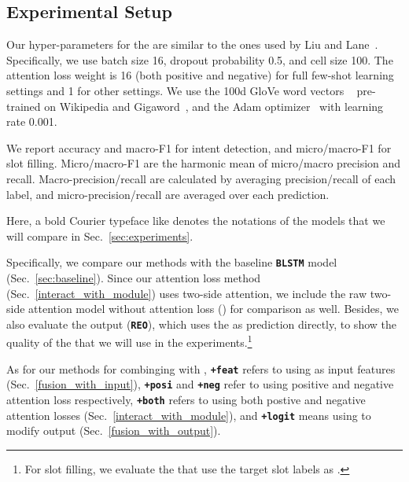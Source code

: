 \subsection{Experimental Setup}
 Our hyper-parameters for the \BLSTM are similar to the ones used by Liu and
Lane~. Specifically, we use batch size 16, dropout probability 0.5, and \BLSTM cell size 100. The attention
loss weight is 16 (both positive and negative) for full few-shot learning settings and 1 for other settings. We use the 100d GloVe word
vectors ~\cite{pennington2014glove} pre-trained on Wikipedia and Gigaword~\cite{parker2011english}, and the Adam
optimizer~\cite{kingma2014adam} with learning rate 0.001.

We report accuracy and macro-F1 for intent detection, and micro/macro-F1 for slot filling.
Micro/macro-F1 are the harmonic mean of micro/macro precision and recall.
Macro-precision/recall are calculated by averaging precision/recall of each label, and micro-precision/recall are averaged over each prediction.

 Here, a bold Courier typeface like \textbf{\BLSTM} denotes the notations of the models that
we will compare in Sec.~\ref{sec:experiments}.

Specifically, we compare our methods with the baseline \textbf{\texttt{BLSTM}} model (Sec.~\ref{sec:baseline}). Since our attention loss
method (Sec.~\ref{interact_with_module}) uses two-side attention, we include the raw two-side attention model without attention loss
(\textbf{\ptatt}) for comparison as well. Besides, we also evaluate the \RE output (\textbf{\texttt{REO}}), which uses the \REtags as
prediction directly, to show the quality of the \REs that we will use in the experiments.\footnote{
	For slot filling, we evaluate the \REs that use the target slot labels as \REtags.}

As for our methods for combinging \REs with \NN,
\textbf{\texttt{+feat}}  refers to using \REtag as input features (Sec.~\ref{fusion_with_input}),
\textbf{\texttt{+posi}} and \textbf{\texttt{+neg}} refer to using positive and negative attention loss respectively,
\textbf{\texttt{+both}} refers to using both postive and negative attention losses (Sec.~\ref{interact_with_module}),
and \textbf{\texttt{+logit}} means using \REtag to modify \NN output (Sec.~\ref{fusion_with_output}).

